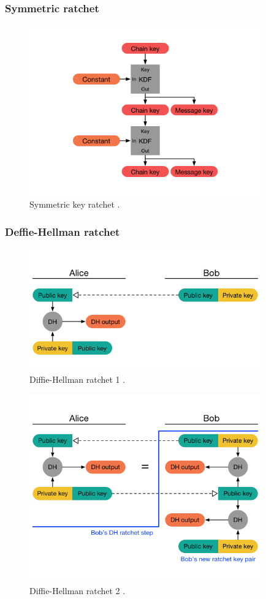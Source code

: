 \subsubsection{Symmetric ratchet}

\begin{figure}[H]
	\centering
	\includegraphics[width=10cm]{figures/symmetrickeyratchet.png}
	\caption{Symmetric key ratchet \cite{doubleratchet}.}
	\label{fig:symkeyratchet}
\end{figure}

\subsubsection{Deffie-Hellman ratchet}

\begin{figure}[H]
	\centering
	\includegraphics[width=10cm]{figures/dhratchet1.png}
	\caption{Diffie-Hellman ratchet 1 \cite{doubleratchet}.}
	\label{fig:dhratchet1}
\end{figure}

\begin{figure}[H]
	\centering
	\includegraphics[width=10cm]{figures/dhratchet2.png}
	\caption{Diffie-Hellman ratchet 2 \cite{doubleratchet}.}
	\label{fig:dhratchet2}
\end{figure}

